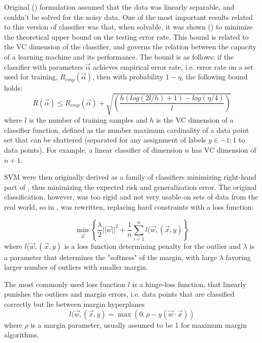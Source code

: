 Original (\cite{vapnik92}) formulation assumed that the data was linearly separable, and couldn't be solved for the noisy data. One of the most important results related to this version of classifier was that, when solvable, it was shown (\cite{Vapnik95})  to minimize the theoretical upper bound on the testing error rate. This bound is related to the VC dimension of the classifier, and  governs the relation between the capacity of a learning machine and its performance. The bound is as follows: if the classifier with parameters $\vec{\alpha}$ achieves empirical error rate, i.e. error rate on a set used for training, $R_{emp}(\vec{\alpha})$, then with probability $1-\eta$, the following bound holds: 
\begin{equation}
\label{VCbound}
R(\vec{\alpha})\le R_{emp}(\vec{\alpha})+\sqrt{\left( \frac{h(log(2l/h)+1)-log(\eta/4)}{l}\right)}
\end{equation}
where $l$ is the number of training samples and $h$ is the VC dimension of a classifier function, defined as the number maximum cardinality of a data point set that can be shattered (separated for any assignment of labels $y\in{-1;1}$ to data points). For example, a linear classifier of dimension $n$ has VC dimension of $n+1$.

SVM were then originally derived as a  family of classifiers minimizing right-hand part of , thus minimizing the expected risk and generalization error. The original classification, however, was too rigid  and not very usable on sets of data from the real world, so in \cite{SVM},  was rewritten,  replacing hard constraints with a loss function:

\begin{equation}
\label{expandedPrimal}
 \min_{\vec{w}} \left\{ \frac{\lambda}{2}||\vec{w}||^2 +\frac{1}{n}\sum_{i=1}^{n}l(\vec{w},(\vec{x},y)\right\}
\end{equation}
where $l(\vec{w},(\vec{x},y)$ is a loss function determining penalty for the outlier and $\lambda$ is a parameter that determines the "softness" of the margin, with large $\lambda$ favoring larger number of outliers with smaller margin.

The most commonly used loss function $l$ is a hinge-loss function, that linearly punishes the outliers and margin errors, i.e. data points that are classified correctly but lie between margin hyperplanes
$$
\label{Hingeloss}
l(\vec{w},(\vec{x},y)=\max(0, \rho-y(\vec{w}\cdot\vec{x}))
$$
where $\rho$ is a margin parameter, usually assumed to be 1 for maximum margin algorithms.

